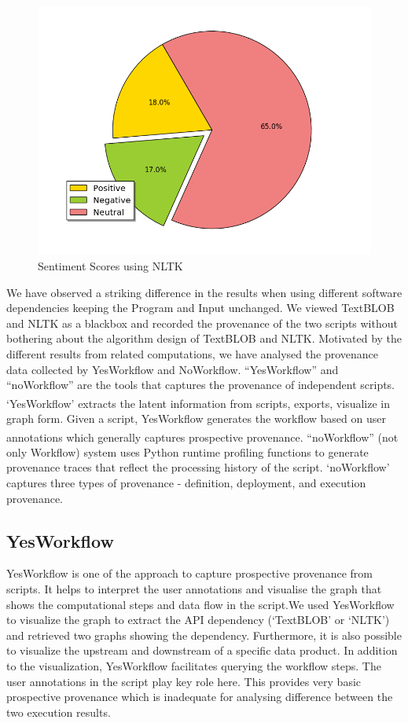 \documentclass[10pt,conference,twocolumn]{IEEEtran}
\begin{document}
\begin{figure}[H]
\begin{center}
            \includegraphics[scale=0.33]{Pie_NLTK.png}
\end{center}
\centering
\caption{Sentiment Scores using NLTK}
\end{figure} 
We have observed a striking difference in the results when using different software dependencies keeping the Program and Input unchanged. We viewed TextBLOB and NLTK as a blackbox and recorded the provenance of the two scripts without bothering about the algorithm design of TextBLOB and NLTK.  Motivated by the different results from related computations, we have analysed the provenance data collected by YesWorkflow and NoWorkflow.  \enquote{YesWorkflow} and \enquote{noWorkflow} are the tools that captures the provenance of independent scripts. ‘YesWorkflow’\textsuperscript{\cite{McPhillips2015}} extracts the latent information from scripts, exports, visualize in graph form. Given a script, YesWorkflow generates the workflow based on user annotations which generally captures prospective provenance.
\enquote{noWorkflow}\textsuperscript{\cite{Pimentel2015}} (not only Workflow) system uses Python runtime profiling functions to generate provenance traces that reflect the processing history of the script. ‘noWorkflow’ captures three types of provenance - definition, deployment, and execution provenance. 
\subsection{YesWorkflow}
YesWorkflow is one of the approach to capture prospective provenance from scripts. It helps to interpret the user annotations and visualise the graph that shows the computational steps and data flow in the script.We used YesWorkflow to visualize the graph to extract the API dependency (‘TextBLOB’ or ‘NLTK’) and retrieved two graphs showing the dependency. Furthermore, it is also possible to visualize the upstream and downstream of a specific data product. In addition to the visualization, YesWorkflow facilitates querying the workflow steps. The user annotations in the script play key role here. This provides very basic prospective provenance which is inadequate for analysing difference between the two execution results.
\end{document}
